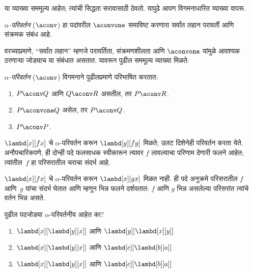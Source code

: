 या व्याख्या सममूल्य आहेत; त्यांची सिद्धता सरावासाठी ठेवतो.
यापुढे आपण विगमनाधारित व्याख्या वापरू.

\begin{defn}
  \emph{$\alpha$-परिवर्तन} ($\aconv$) हा पदांवरील
  $\aconvone$ समाविष्ट करणारा सर्वांत लहान परावर्ती
  आणि संक्रमक संबंध आहे.
\end{defn}

वरच्याप्रमाणे, ``सर्वांत लहान'' म्हणजे परावर्तिता, संक्रमणशीलता आणि
$\aconvone$ यांमुळे आवश्यक ठरणाऱ्या जोड्याच या संबंधात
असतात. यावरून पुढील सममूल्य व्याख्या मिळते:

\begin{defn} \label{lam:syn:alp:defn:aconv}
  \emph{$\alpha$-परिवर्तन} ($\aconv$) विगमनाने
  पुढीलप्रमाणे परिभाषित करतात:
  \begin{enumerate}
  \item $P \aconv Q$ आणि $Q \aconv R$ असतील, तर $P \aconv R$.
    \label{lam:syn:alp:defn:aconv1}
  \item $P \aconvone Q$ असेल, तर $P \aconv Q$. \label{lam:syn:alp:defn:aconv2}
  \item $P \aconv P$. \label{lam:syn:alp:defn:aconv3}
  \end{enumerate}
\end{defn}

\begin{ex}
  $\lambd[x][f x]$ चे $\alpha$-परिवर्तन करून
  $\lambd[y][f
  y]$ मिळते; उलट दिशेनेही परिवर्तन करता येते.
  अनौपचारिकपणे, ही दोन्ही पदे फलसाधक स्वीकारून
  त्यावर $f$ लावल्याचा परिणाम देणारी फलने आहेत;
  त्यांतील~$f$ हा परिसरातील चराचा संदर्भ आहे.

  $\lambd[x][f x]$ चे $\alpha$-परिवर्तन करून
  $\lambd[x][g
    x]$ मिळत नाही. ही पदे अनुक्रमे परिसरातील
  $f$ आणि~$g$ यांचा संदर्भ घेतात आणि म्हणून भिन्न
  फलने दर्शवतात: $f$ आणि $g$ भिन्न असलेल्या परिसरांत
  त्यांचे वर्तन भिन्न असते.
\end{ex}

\begin{prob}
  पुढील पदजोड्या $\alpha$-परिवर्तनीय आहेत का?
  \begin{enumerate}
  \item $\lambd[x][\lambd[y][x]]$ आणि $\lambd[y][\lambd[x][y]]$
  \item $\lambd[x][\lambd[y][x]]$ आणि $\lambd[c][\lambd[b][a]]$
  \item $\lambd[x][\lambd[y][x]]$ आणि $\lambd[c][\lambd[b][a]]$
  \end{enumerate}
\end{prob}

